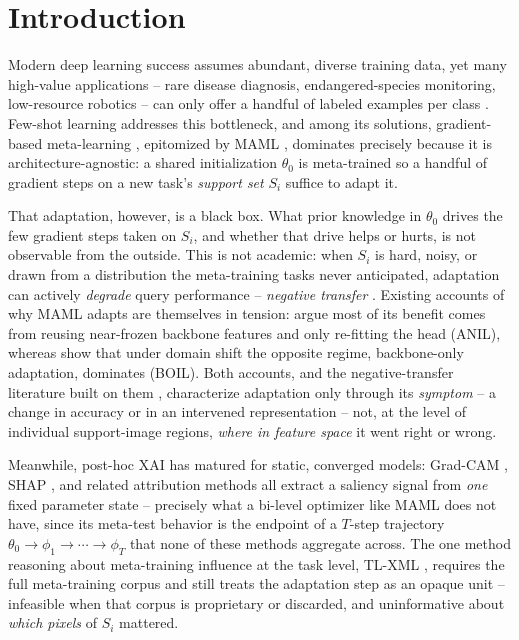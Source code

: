 \section{Introduction}
\label{sec:intro}

Modern deep learning success assumes abundant, diverse training data, yet many high-value applications -- rare disease diagnosis, endangered-species monitoring, low-resource robotics -- can only offer a handful of labeled examples per class \citep{fawakherji2026learning,wang2020generalizing}. Few-shot learning addresses this bottleneck, and among its solutions, gradient-based meta-learning \citep{schmidhuber1987evolutionary,bengio2013optimization}, epitomized by MAML \citep{finn2017model}, dominates precisely because it is architecture-agnostic: a shared initialization $\theta_0$ is meta-trained so a handful of gradient steps on a new task's \emph{support set} $S_i$ suffice to adapt it.

That adaptation, however, is a black box. What prior knowledge in $\theta_0$ drives the few gradient steps taken on $S_i$, and whether that drive helps or hurts, is not observable from the outside. This is not academic: when $S_i$ is hard, noisy, or drawn from a distribution the meta-training tasks never anticipated, adaptation can actively \emph{degrade} query performance -- \emph{negative transfer} \citep{yue2020interventional,si2025meta}. Existing accounts of why MAML adapts are themselves in tension: \citet{raghu2019rapid} argue most of its benefit comes from reusing near-frozen backbone features and only re-fitting the head (ANIL), whereas \citet{oh2020boil} show that under domain shift the opposite regime, backbone-only adaptation, dominates (BOIL). Both accounts, and the negative-transfer literature built on them \citep{yao2019hierarchically,yao2020automated,chen2021hetmaml,parast2026hsfm}, characterize adaptation only through its \emph{symptom} -- a change in accuracy or in an intervened representation -- not, at the level of individual support-image regions, \emph{where in feature space} it went right or wrong.

Meanwhile, post-hoc XAI has matured for static, converged models: Grad-CAM \citep{selvaraju2020grad}, SHAP \citep{lundberg2017unified}, and related attribution methods \citep{simonyan2014visualising,sundararajan2017axiomatic,ribeiro2016lime} all extract a saliency signal from \emph{one} fixed parameter state -- precisely what a bi-level optimizer like MAML does not have, since its meta-test behavior is the endpoint of a $T$-step trajectory $\theta_0 \!\to\! \phi_1 \!\to\! \cdots \!\to\! \phi_T$ that none of these methods aggregate across. The one method reasoning about meta-training influence at the task level, TL-XML \citep{mitsuka2025tlxml}, requires the full meta-training corpus and still treats the adaptation step as an opaque unit -- infeasible when that corpus is proprietary or discarded, and uninformative about \emph{which pixels} of $S_i$ mattered.

